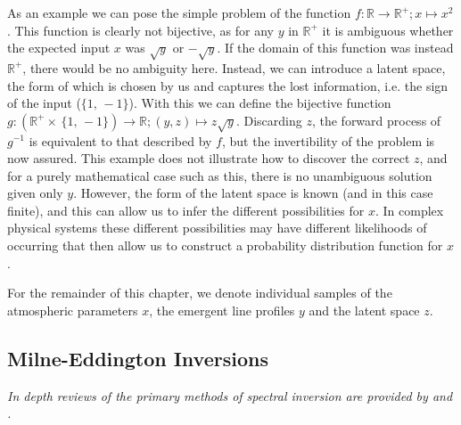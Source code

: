 As an example we can pose the simple problem of the function $f : \mathbb{R} \rightarrow \mathbb{R}^+; x \mapsto x^2$. This function is clearly not bijective, as for any $y$ in $\mathbb{R}^+$ it is ambiguous whether the expected input $x$ was $\sqrt{y}$ or $-\sqrt{y}$.
If the domain of this function was instead $\mathbb{R}^+$, there would be no ambiguity here.
Instead, we can introduce a latent space, the form of which is chosen by us and captures the lost information, i.e. the sign of the input ($\{1,\,-1\}$).
With this we can define the bijective function $g : (\mathbb{R}^+\times\,\{1,\,-1\}) \rightarrow \mathbb{R}; (y, z) \mapsto z \sqrt{y}$.
Discarding $z$, the forward process of $g^{-1}$ is equivalent to that described by $f$, but the invertibility of the problem is now assured.
This example does not illustrate how to discover the correct $z$, and for a purely mathematical case such as this, there is no unambiguous solution given only $y$.
However, the form of the latent space is known (and in this case finite), and this can allow us to infer the different possibilities for $x$.
In complex physical systems these different possibilities may have different likelihoods of occurring that then allow us to construct a probability distribution function for $x$.

For the remainder of this chapter, we denote individual samples of the atmospheric parameters $x$, the emergent line profiles $y$ and the latent space $z$.

\subsection{Milne-Eddington Inversions}

\emph{In depth reviews of the primary methods of spectral inversion are provided by \citet{DelToroIniesta2016} and \citet{DelaCruzRodriguez2017}.}

